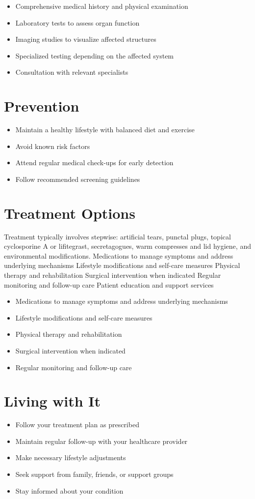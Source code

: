 \begin{itemize}[noitemsep]
  \item Comprehensive medical history and physical examination
  \item Laboratory tests to assess organ function
  \item Imaging studies to visualize affected structures
  \item Specialized testing depending on the affected system
  \item Consultation with relevant specialists
\end{itemize}
\section{Prevention}
\begin{itemize}[noitemsep]
  \item Maintain a healthy lifestyle with balanced diet and exercise
  \item Avoid known risk factors
  \item Attend regular medical check-ups for early detection
  \item Follow recommended screening guidelines
\end{itemize}
\section{Treatment Options}
Treatment typically involves stepwise: artificial tears, punctal plugs, topical cyclosporine A or lifitegrast, secretagogues, warm compresses and lid hygiene, and environmental modifications. Medications to manage symptoms and address underlying mechanisms Lifestyle modifications and self-care measures Physical therapy and rehabilitation Surgical intervention when indicated Regular monitoring and follow-up care Patient education and support services

\begin{itemize}[noitemsep]
  \item Medications to manage symptoms and address underlying mechanisms
  \item Lifestyle modifications and self-care measures
  \item Physical therapy and rehabilitation
  \item Surgical intervention when indicated
  \item Regular monitoring and follow-up care
\end{itemize}
\section{Living with It}
\begin{itemize}[noitemsep]
  \item Follow your treatment plan as prescribed
  \item Maintain regular follow-up with your healthcare provider
  \item Make necessary lifestyle adjustments
  \item Seek support from family, friends, or support groups
  \item Stay informed about your condition
\end{itemize}

